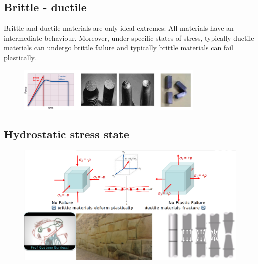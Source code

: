 \documentclass[class=report, crop=false, 12pt,a4paper]{standalone}
\begin{document}
\subsection{Brittle - ductile}
Brittle and ductile materials are only ideal extremes: All materials have an intermediate behaviour. Moreover, under specific states of stress, typically ductile materials can undergo brittle failure and typically brittle materials can fail plastically. 
\begin{figure}[H]
  \centering
  \includegraphics[width = 0.8\textwidth]{../img/diagram12.png}
  \caption{}
\end{figure}
\subsection{Hydrostatic stress state}
\begin{figure}[H]
  \centering
  \includegraphics[width =\textwidth]{../img/diagram13.png}
  \caption{}
\end{figure}
\end{document}

